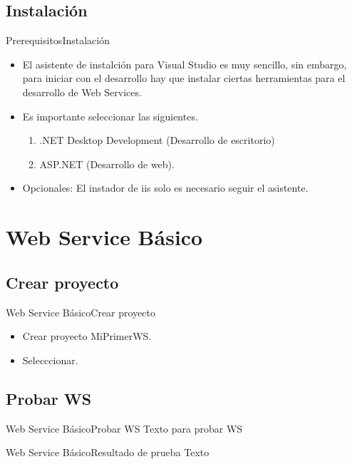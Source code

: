 \documentclass[10pt]{beamer}
\begin{document}
\subsection{Instalación}
\begin{frame}{Prerequisitos}{Instalación}
	\begin{itemize}
		\item<1-> El asistente de instalción para Visual Studio es muy sencillo, sin embargo, para iniciar con el desarrollo hay que instalar ciertas herramientas para el desarrollo de Web Services.
		\item<2-> Es importante seleccionar las siguientes.
		\begin{enumerate}
			\item .NET Desktop Development (Desarrollo de escritorio)
			\item ASP.NET (Desarrollo de web).
		\end{enumerate}
		\item<3-> Opcionales: El instador de iis solo es necesario seguir el asistente.
	\end{itemize}
\end{frame}

\section{Web Service Básico}
\subsection{Crear proyecto}
\begin{frame}{Web Service Básico}{Crear proyecto}
	\begin{itemize}
		\item<1-> Crear proyecto MiPrimerWS.
		\item<1-> Selecccionar.
	\end{itemize}
\end{frame}
\subsection{Probar WS}
\begin{frame}{Web Service Básico}{Probar WS}
	Texto para probar WS
\end{frame}
\begin{frame}{Web Service Básico}{Resultado de prueba}
	Texto
\end{frame}
\end{document}
